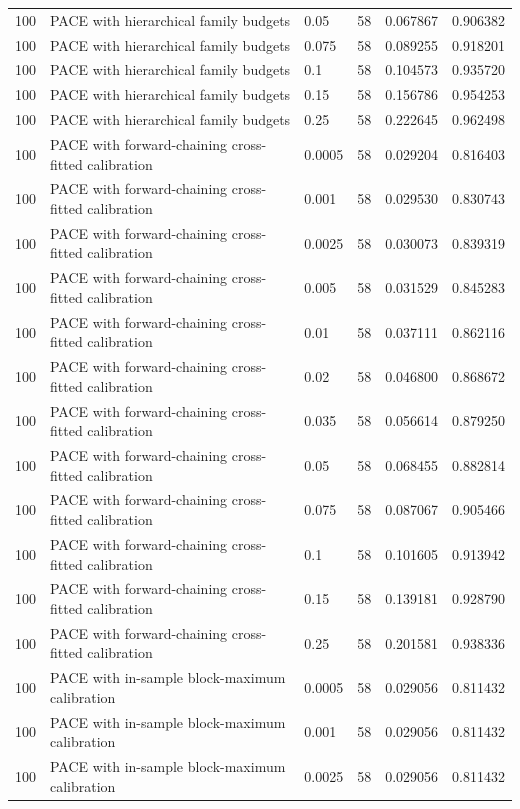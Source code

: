 \begin{tabular}{llllll}
100 & PACE with hierarchical family budgets & 0.05 & 58 & 0.067867 & 0.906382 \\
100 & PACE with hierarchical family budgets & 0.075 & 58 & 0.089255 & 0.918201 \\
100 & PACE with hierarchical family budgets & 0.1 & 58 & 0.104573 & 0.935720 \\
100 & PACE with hierarchical family budgets & 0.15 & 58 & 0.156786 & 0.954253 \\
100 & PACE with hierarchical family budgets & 0.25 & 58 & 0.222645 & 0.962498 \\
100 & PACE with forward-chaining cross-fitted calibration & 0.0005 & 58 & 0.029204 & 0.816403 \\
100 & PACE with forward-chaining cross-fitted calibration & 0.001 & 58 & 0.029530 & 0.830743 \\
100 & PACE with forward-chaining cross-fitted calibration & 0.0025 & 58 & 0.030073 & 0.839319 \\
100 & PACE with forward-chaining cross-fitted calibration & 0.005 & 58 & 0.031529 & 0.845283 \\
100 & PACE with forward-chaining cross-fitted calibration & 0.01 & 58 & 0.037111 & 0.862116 \\
100 & PACE with forward-chaining cross-fitted calibration & 0.02 & 58 & 0.046800 & 0.868672 \\
100 & PACE with forward-chaining cross-fitted calibration & 0.035 & 58 & 0.056614 & 0.879250 \\
100 & PACE with forward-chaining cross-fitted calibration & 0.05 & 58 & 0.068455 & 0.882814 \\
100 & PACE with forward-chaining cross-fitted calibration & 0.075 & 58 & 0.087067 & 0.905466 \\
100 & PACE with forward-chaining cross-fitted calibration & 0.1 & 58 & 0.101605 & 0.913942 \\
100 & PACE with forward-chaining cross-fitted calibration & 0.15 & 58 & 0.139181 & 0.928790 \\
100 & PACE with forward-chaining cross-fitted calibration & 0.25 & 58 & 0.201581 & 0.938336 \\
100 & PACE with in-sample block-maximum calibration & 0.0005 & 58 & 0.029056 & 0.811432 \\
100 & PACE with in-sample block-maximum calibration & 0.001 & 58 & 0.029056 & 0.811432 \\
100 & PACE with in-sample block-maximum calibration & 0.0025 & 58 & 0.029056 & 0.811432 \\

\end{tabular}
